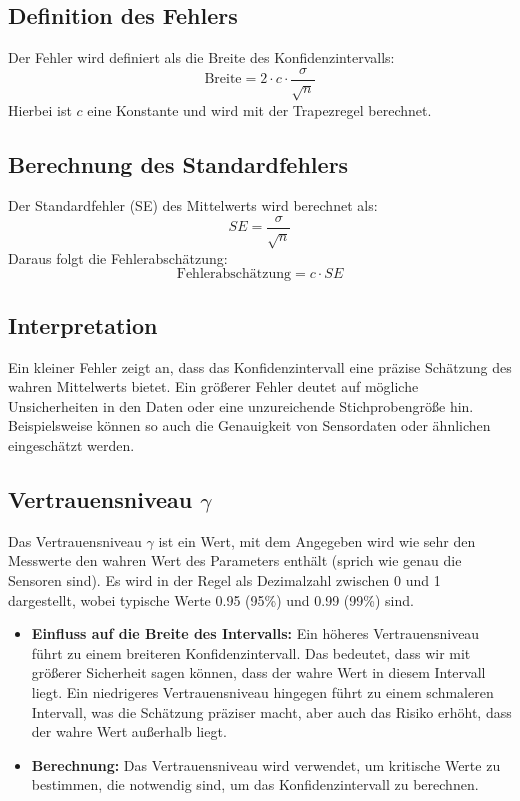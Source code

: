 \subsection*{Definition des Fehlers}
Der Fehler wird definiert als die Breite des Konfidenzintervalls:
\[
\text{Breite} = 2 \cdot c \cdot \frac{\sigma}{\sqrt{n}}
\]
Hierbei ist $c$ eine Konstante und wird mit der Trapezregel berechnet.

\subsection*{Berechnung des Standardfehlers}
Der Standardfehler (SE) des Mittelwerts wird berechnet als:
\[
SE = \frac{\sigma}{\sqrt{n}}
\]
Daraus folgt die Fehlerabschätzung:
\[
\text{Fehlerabschätzung} = c \cdot SE
\]
\subsection*{Interpretation}
Ein kleiner Fehler zeigt an, dass das Konfidenzintervall eine präzise Schätzung des wahren Mittelwerts bietet. Ein größerer Fehler deutet auf mögliche Unsicherheiten in den Daten oder eine unzureichende Stichprobengröße hin. Beispielsweise können so auch die Genauigkeit von Sensordaten oder ähnlichen eingeschätzt werden. 


\subsection{Vertrauensniveau $\gamma$}
\label{sec:vertrauensniveau}
Das Vertrauensniveau \(\gamma\) ist ein Wert, mit dem Angegeben wird wie sehr den Messwerte den wahren Wert des Parameters enthält (sprich wie genau die Sensoren sind). Es wird in der Regel als Dezimalzahl zwischen 0 und 1 dargestellt, wobei typische Werte 0.95 (95\%) und 0.99 (99\%) sind.

\begin{itemize}
    \item \textbf{Einfluss auf die Breite des Intervalls:} Ein höheres Vertrauensniveau führt zu einem breiteren Konfidenzintervall. Das bedeutet, dass wir mit größerer Sicherheit sagen können, dass der wahre Wert in diesem Intervall liegt. Ein niedrigeres Vertrauensniveau hingegen führt zu einem schmaleren Intervall, was die Schätzung präziser macht, aber auch das Risiko erhöht, dass der wahre Wert außerhalb liegt.
    
    \item \textbf{Berechnung:} Das Vertrauensniveau wird verwendet, um kritische Werte zu bestimmen, die notwendig sind, um das Konfidenzintervall zu berechnen. 
\end{itemize}

